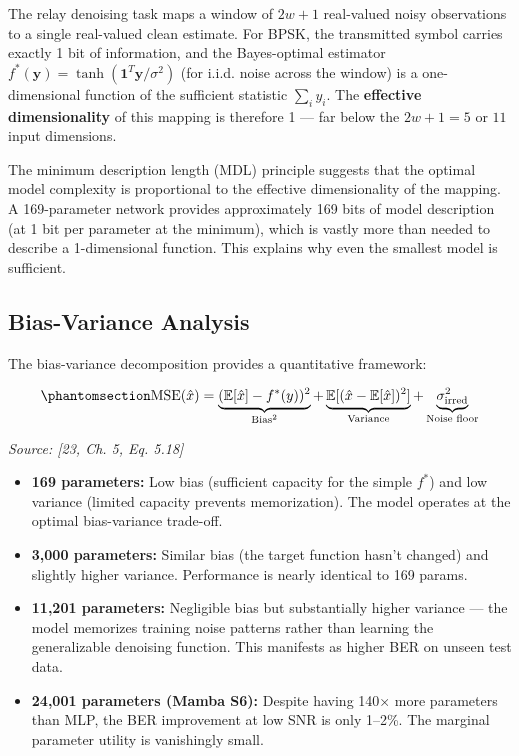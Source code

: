 The relay denoising task maps a window of \(2w+1\) real-valued noisy observations to a single real-valued clean estimate. For BPSK, the transmitted symbol carries exactly 1 bit of information, and the Bayes-optimal estimator \(f^*(\mathbf{y}) = \tanh(\mathbf{1}^T \mathbf{y} / \sigma^2)\) (for i.i.d. noise across the window) is a one-dimensional function of the sufficient statistic \(\sum_i y_i\). The \textbf{effective dimensionality} of this mapping is therefore 1 --- far below the \(2w+1 = 5\) or \(11\) input dimensions.

The minimum description length (MDL) principle suggests that the optimal model complexity is proportional to the effective dimensionality of the mapping. A 169-parameter network provides approximately 169 bits of model description (at 1 bit per parameter at the minimum), which is vastly more than needed to describe a 1-dimensional function. This explains why even the smallest model is sufficient.

\subsection{Bias-Variance Analysis}\label{sec:bias-variance-analysis}

The bias-variance decomposition provides a quantitative framework:

\begin{equation}\protect\phantomsection\label{eq:bias-variance-relay}{\text{MSE}(\hat{x}) = \underbrace{(\mathbb{E}[\hat{x}] - f^*(y))^2}_{\text{Bias}^2} + \underbrace{\mathbb{E}[(\hat{x} - \mathbb{E}[\hat{x}])^2]}_{\text{Variance}} + \underbrace{\sigma^2_{\text{irred}}}_{\text{Noise floor}}
}\end{equation} \par{\small\textit{Source: [23, Ch. 5, Eq. 5.18]}}

\begin{itemize}
\tightlist
\item
  \textbf{169 parameters:} Low bias (sufficient capacity for the simple \(f^*\)) and low variance (limited capacity prevents memorization). The model operates at the optimal bias-variance trade-off.
\item
  \textbf{3,000 parameters:} Similar bias (the target function hasn't changed) and slightly higher variance. Performance is nearly identical to 169 params.
\item
  \textbf{11,201 parameters:} Negligible bias but substantially higher variance --- the model memorizes training noise patterns rather than learning the generalizable denoising function. This manifests as higher BER on unseen test data.
\item
  \textbf{24,001 parameters (Mamba S6):} Despite having 140× more parameters than MLP, the BER improvement at low SNR is only 1--2\%. The marginal parameter utility is vanishingly small.
\end{itemize}


